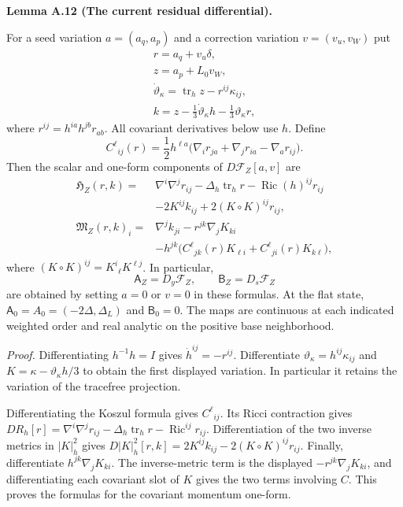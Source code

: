 \documentclass[
  english,
  11pt,
  reqno]{amsart}
\makeatletter
\newcommand{\pandocstatementheading}[1]{%
  \par\if@nobreak\else
    \addpenalty{\@beginparpenalty}%
    \addvspace{.5\baselineskip plus .2\baselineskip minus .2\baselineskip}%
  \fi
  {\normalfont\bfseries #1\par}%
  \nobreak\@afterindenttrue\@afterheading
}
\makeatother
\begin{document}
\pandocstatementheading{\leavevmode{}\label{lem:online-current-residual-differential}Lemma A.12 (The current residual differential).}

For a seed variation \(a=(a_q,a_p)\) and a correction variation
\(v=(v_u,v_W)\) put%
 \[
\begin{gathered}
r=a_q+v_u\delta, \\
z=a_p+L_0v_W, \\
\dot\vartheta_\kappa=\operatorname{tr}_h z-r^{ij}\kappa_{ij}, \\
k=z-\frac13\dot\vartheta_\kappa h-\frac13\vartheta_\kappa r,
\end{gathered}
\] where \(r^{ij}=h^{ia}h^{jb}r_{ab}\). All covariant derivatives below
use \(h\). Define \[
C^\ell{}_{ij}(r)=\frac12h^{\ell a}
\bigl(\nabla_i r_{ja}+\nabla_jr_{ia}-\nabla_ar_{ij}\bigr).
\] Then the scalar and one-form components of \(D\mathcal F_Z[a,v]\) are%
 \[
\begin{aligned}
\mathfrak H_Z(r,k)
={}&\nabla^i\nabla^jr_{ij}
-\Delta_h\operatorname{tr}_hr
-\operatorname{Ric}(h)^{ij}r_{ij}\\
&-2K^{ij}k_{ij}
+2(K\circ K)^{ij}r_{ij},\\
\mathfrak M_Z(r,k)_i
={}&\nabla^jk_{ji}
-r^{jk}\nabla_jK_{ki}\\
&-h^{jk}\bigl(C^\ell{}_{jk}(r)K_{\ell i}
             +C^\ell{}_{ji}(r)K_{k\ell}\bigr),
\end{aligned}
\] where \((K\circ K)^{ij}=K^i{}_\ell K^{\ell j}\). In particular,%
\[
\mathsf A_Z=D_y\mathcal F_Z,\qquad
\mathsf B_Z=D_s\mathcal F_Z
\] are obtained by setting \(a=0\) or \(v=0\) in these formulas. At the
flat state, \(\mathsf A_0=A_0=(-2\Delta,\Delta_L)\) and
\(\mathsf B_0=0\). The maps are continuous at each indicated weighted
order and real analytic on the positive base neighborhood.

\emph{Proof.} Differentiating \(h^{-1}h=I\) gives
\(\dot h^{ij}=-r^{ij}\). Differentiate
\(\vartheta_\kappa=h^{ij}\kappa_{ij}\) and
\(K=\kappa-\vartheta_\kappa h/3\) to obtain the first displayed
variation. In particular it retains the variation of the tracefree
projection.

Differentiating the Koszul formula gives \(C^\ell{}_{ij}\). Its Ricci
contraction gives
\(DR_h[r]=\nabla^i\nabla^jr_{ij}-\Delta_h\operatorname{tr}_hr-\operatorname{Ric}^{ij}r_{ij}\).
Differentiation of the two inverse metrics in \(|K|_h^2\) gives
\(D|K|_h^2[r,k]=2K^{ij}k_{ij}-2(K\circ K)^{ij}r_{ij}\). Finally,
differentiate \(h^{jk}\nabla_jK_{ki}\). The inverse-metric term is the
displayed \(-r^{jk}\nabla_jK_{ki}\), and differentiating each covariant
slot of \(K\) gives the two terms involving \(C\). This proves the
formulas for the covariant momentum one-form.
\end{document}
